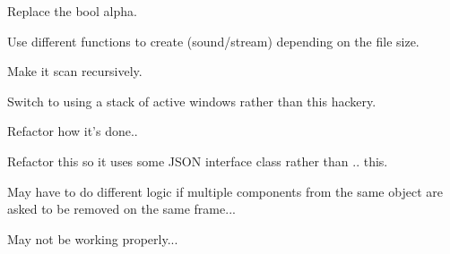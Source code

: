 \begin{DoxyRefList}
\item[\label{todo__todo000010}%
\hypertarget{todo__todo000010}{}%
Member \hyperlink{classDCEngine_1_1SpriteSource_ab6e4b6ab4e014b9fe0b5c7e29a4297d1}{D\-C\-Engine\-:\-:Sprite\-Source\-:\-:Load\-Texture} ()]Replace the bool alpha.  
\item[\label{todo__todo000014}%
\hypertarget{todo__todo000014}{}%
Member \hyperlink{classDCEngine_1_1Systems_1_1Audio_a23e10ddebd31ba775a0f1891cc9506b2}{D\-C\-Engine\-:\-:Systems\-:\-:Audio\-:\-:Create\-Sound} (std\-::string \&sound\-File, F\-M\-O\-D\-Sound\-Ptr \&sound\-Ptr)]Use different functions to create (sound/stream) depending on the file size.  
\item[\label{todo__todo000017}%
\hypertarget{todo__todo000017}{}%
Member \hyperlink{classDCEngine_1_1Systems_1_1Content_a12d79aa3afbd0ee1d48bcc885de355b7}{D\-C\-Engine\-:\-:Systems\-:\-:Content\-:\-:Scan\-And\-Generate\-Resources} ()]Make it scan recursively.  
\item[\label{todo__todo000018}%
\hypertarget{todo__todo000018}{}%
Member \hyperlink{classDCEngine_1_1Systems_1_1Editor_a4d530af60faddb7e243bcdd21e58d973}{D\-C\-Engine\-:\-:Systems\-:\-:Editor\-:\-:Toggle\-Test} ()]Switch to using a stack of active windows rather than this hackery.  
\item[\label{todo__todo000034}%
\hypertarget{todo__todo000034}{}%
Member \hyperlink{classDCEngine_1_1Systems_1_1Factory_af6ded32c3d92e2cfa32dc7511df268da}{D\-C\-Engine\-:\-:Systems\-:\-:Factory\-:\-:Build\-Game\-Object} (Serialized\-Member $\ast$object\-Data, Space \&space)]Refactor how it's done..  
\item[\label{todo__todo000033}%
\hypertarget{todo__todo000033}{}%
Member \hyperlink{classDCEngine_1_1Systems_1_1Factory_a3cc34e680424f1982f719da99282765b}{D\-C\-Engine\-:\-:Systems\-:\-:Factory\-:\-:Create\-Game\-Object} (Archetype\-Ptr archetype, Space \&space, bool init)]Refactor this so it uses some J\-S\-O\-N interface class rather than .. this.  
\item[\label{todo__todo000035}%
\hypertarget{todo__todo000035}{}%
Member \hyperlink{classDCEngine_1_1Systems_1_1Factory_a776cd6cdc54459b710a07d16acd9872f}{D\-C\-Engine\-:\-:Systems\-:\-:Factory\-:\-:Destroy\-Components} ()]May have to do different logic if multiple components from the same object are asked to be removed on the same frame...  
\item[\label{todo__todo000036}%
\hypertarget{todo__todo000036}{}%
Member \hyperlink{classDCEngine_1_1Systems_1_1Factory_a7856a2fa567887c4721c81c9cbb9d54e}{D\-C\-Engine\-:\-:Systems\-:\-:Factory\-:\-:Destroy\-Spaces} ()]May not be working properly...  

\end{DoxyRefList}
